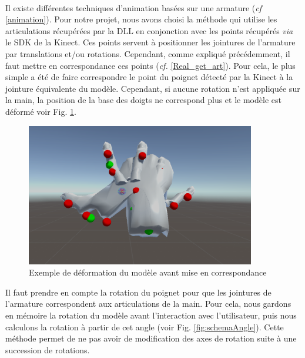 \paragraph{} 
Il existe différentes techniques d'animation basées sur une armature (\textit{cf} \ref{animation}).
Pour notre projet, nous avons choisi la méthode qui utilise les articulations récupérées par la DLL en conjonction avec les points récupérés \textit{via} le SDK de la Kinect. 
Ces points servent à positionner les jointures de l'armature par translations et/ou rotations.
Cependant, comme expliqué précédemment, il faut mettre en correspondance ces points (\textit{cf.} \ref{Real_get_art}).
Pour cela, le plus simple a été de faire correspondre le point du poignet détecté par la Kinect à la jointure équivalente du modèle.
Cependant, si aucune rotation n'est appliquée sur la main, la position de la base des doigts ne correspond plus et le modèle est déformé voir Fig. \ref{fig:badhand}.

\begin{figure}
	\label{fig:badhand}
	\centering
	\includegraphics[width=10cm]{images/BadHand.png}
	\caption{Exemple de déformation du modèle avant mise en correspondance}	
\end{figure}

Il faut prendre en compte la rotation du poignet pour que les jointures de l'armature correspondent aux articulations de la main. 
Pour cela, nous gardons en mémoire la rotation du modèle avant l'interaction avec l'utilisateur,
puis nous calculons la rotation à partir de cet angle (voir Fig. \ref{fig:schemaAngle}). Cette méthode permet de ne pas avoir de modification des axes de rotation suite à une succession de rotations.

